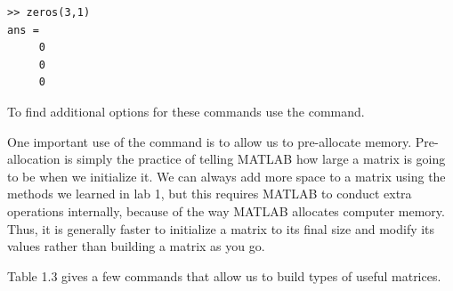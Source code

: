 \begin{lstlisting}[style=matlab]
>> zeros(3,1)
ans =
     0
     0
     0
\end{lstlisting}

To find additional options for these commands use the  command.


One important use of the command  is to allow us to pre-allocate memory. Pre-allocation is simply the practice of telling MATLAB how large a matrix is going to be when we initialize it. We can always add more space to a matrix using the methods we learned in lab 1, but this requires MATLAB to conduct extra operations internally, because of the way MATLAB allocates computer memory. Thus, it is generally faster to initialize a matrix to its final size and modify its values rather than building a matrix as you go.



Table 1.3 gives a few commands that allow us to build types of useful matrices.


